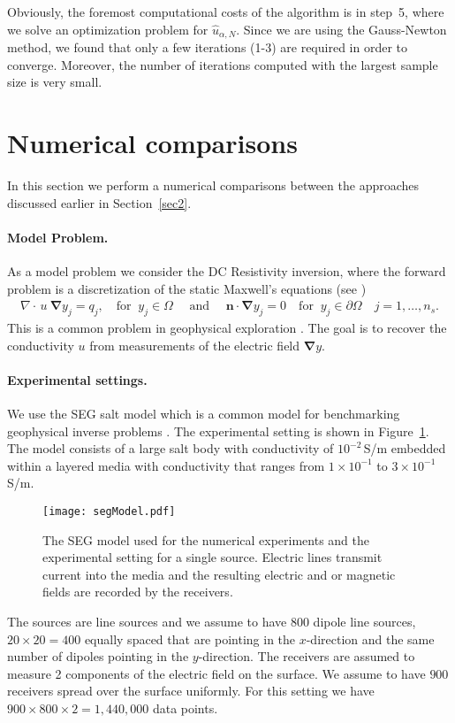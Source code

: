 \documentclass[12pt]{article}
\renewcommand{\vec}[1]{\ensuremath{\mathbf{#1}}}
\newcommand{\nn}{\vec{n}}
\renewcommand{\div}{\nabla\cdot\,}
\newcommand{\grad}{\ensuremath {\vec \nabla}}
\begin{document}
Obviously, the foremost computational costs of the algorithm is in step~5, where we solve an optimization problem for $\widehat u_{\alpha,N}$. Since we are using the Gauss-Newton method, we found that only a few iterations (1-3) are required in order to converge. Moreover, the number of iterations computed with the largest sample size is very small.

\section{Numerical comparisons}
\label{sec4}

In this section we perform a numerical comparisons between the approaches discussed earlier in Section~\ref{sec2}.

\paragraph{Model Problem.} As a model problem we consider the DC Resistivity inversion, where the forward problem is a discretization of the static Maxwell's equations (see \cite{hao2,na})
\begin{eqnarray}
\label{maxwell}
\div  u \ \grad y_j =  q_j, \quad \mbox{for } \ y_j \in \Omega \quad \mbox{ and } \quad \nn \cdot \grad y_j = 0 \quad \mbox{for } \ y_j \in \partial \Omega \quad j=1,\ldots,n_s.
\end{eqnarray}
This is a common problem in geophysical exploration \cite{wardhow}. The goal is to recover the conductivity $u$ from measurements of the electric field $\grad y$.


\paragraph{Experimental settings.}

We use the SEG salt model which is a common model for benchmarking geophysical inverse problems \cite{Alkhalifah1998}. The experimental setting is shown in Figure~\ref{fig1}. The model consists of a large salt body with conductivity of $10^{-2}$\,S/m embedded within a layered media with conductivity that ranges from $1 \times 10^{-1}$ to $3 \times 10^{-1}$\,S/m.
\begin{figure}
\begin{center}
\texttt{[image: segModel.pdf]}
\caption{The SEG model used for the numerical experiments and the experimental setting for a single source. Electric lines transmit current into the media and the resulting electric and or magnetic fields are recorded by the receivers.
\label{fig1}}
\end{center}
\end{figure}
The sources are line sources and we assume to have 800 dipole line sources, $20 \times 20 =400$ equally spaced that are pointing in the $x$-direction and the same number of  dipoles pointing in the $y$-direction. The receivers are assumed to measure 2 components of the electric field on the surface. We assume to have $900$ receivers spread over the surface uniformly. For this setting we have $900 \times 800 \times  2 = 1,440,000$ data points.
\end{document}
